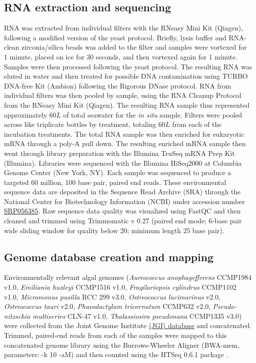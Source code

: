 \subsection{RNA extraction and sequencing}
RNA was extracted from individual filters with the RNeasy Mini Kit (Qiagen), following a modified version of the yeast protocol. Briefly, lysis buffer and RNA-clean zirconia/silica beads was added to the filter and samples were vortexed for 1 minute, placed on ice for 30 seconds, and then vortexed again for 1 minute. Samples were then processed following the yeast protocol. The resulting RNA was eluted in water and then treated for possible DNA contamination using TURBO DNA-free Kit (Ambion) following the Rigorous DNase protocol. RNA from individual filters was then pooled by sample, using the RNA Cleanup Protocol from the RNeasy Mini Kit (Qiagen). The resulting RNA sample thus represented approximately $60 L$ of total seawater for the \textit{in situ} sample. Filters were pooled across like triplicate bottles by treatment, totaling $60 L$ from each of the incubation treatments. The total RNA sample was then enriched for eukaryotic mRNA through a poly-A pull down. The resulting enriched mRNA sample then went through library preparation with the Illumina TruSeq mRNA Prep Kit (Illumina). Libraries were sequenced with the Illumina HiSeq2000 at Columbia Genome Center (New York, NY). Each sample was sequenced to produce a targeted 60 million, 100 base pair, paired end reads. These environmental sequence data are deposited in the Sequence Read Archive (SRA) through the National Center for Biotechnology Information (NCBI) under accession number \href{http://google.com}{SRP056385}. Raw sequence data quality was visualized using FastQC and then cleaned and trimmed using Trimmomatic v 0.27 (paired end mode; 6-base pair wide sliding window for quality below 20; minimum length 25 base pair). \par
\subsection{Genome database creation and mapping}
Environmentally relevant algal genomes (\textit{Aureococcus anophagefferens} CCMP1984 v1.0, \textit{Emiliania huxleyi} CCMP1516 v1.0, \textit{Fragilariopsis cylindrus} CCMP1102 v1.0, \textit{Micromonas pusilla} RCC 299 v3.0, \textit{Ostreococcus lucimarinus} v2.0, \textit{Ostreococcus tauri} v2.0, \textit{Phaeodactylum tricornutum} CCMP632 v2.0, \textit{Pseudo-nitzschia multiseries} CLN-47 v1.0, \textit{Thalassiosira pseudonana} CCMP1335 v3.0) were collected from the Joint Genome Institute \href{http://genome.jgi.doe.gov/}{(JGI) database} and concatenated. Trimmed, paired-end reads from each of the samples were mapped to this concatenated genome library using the Burrows-Wheeler Aligner \citep{Li2010} (BWA-mem, parameters: -k 10 -aM) and then counted using the HTSeq 0.6.1 package \citep{Anders2014}.\par 
